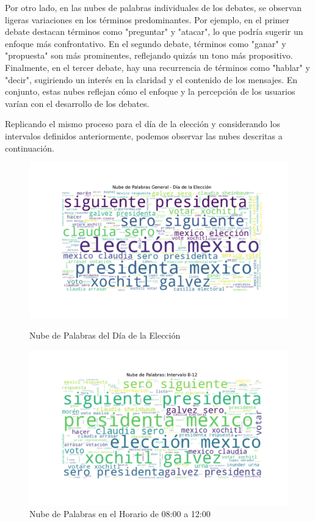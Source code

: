 \documentclass[10pt, a4paper]{article}
\begin{document}
	Por otro lado, en las nubes de palabras individuales de los debates, se observan ligeras variaciones en los términos predominantes. Por ejemplo, en el primer debate destacan términos como "preguntar" y "atacar", lo que podría sugerir un enfoque más confrontativo. En el segundo debate, términos como "ganar" y "propuesta" son más prominentes, reflejando quizás un tono más propositivo. Finalmente, en el tercer debate, hay una recurrencia de términos como "hablar" y "decir", sugiriendo un interés en la claridad y el contenido de los mensajes. En conjunto, estas nubes reflejan cómo el enfoque y la percepción de los usuarios varían con el desarrollo de los debates.
	
	Replicando el mismo proceso para el día de la elección y considerando los intervalos definidos anteriormente, podemos observar las nubes descritas a continuación.
	
	\begin{figure}[h!]
		\centering
		\begin{minipage}{0.49\textwidth} %
			\includegraphics[width=\linewidth]{nube_general_eleccion.pdf} 
			\vspace{-10mm}
			\caption{Nube de Palabras del Día de la Elección}
			\label{fig:nubeDiaEleccion}
		\end{minipage}
		\hfill %
		\begin{minipage}{0.49\textwidth}
			\includegraphics[width=\linewidth]{nube_intervalo_8-12.pdf}
			\vspace{-10mm}
			\caption{Nube de Palabras en el Horario de 08:00 a 12:00}
			\label{fig:nubeIntervalo812}
		\end{minipage}
	\end{figure}
	
\end{document}
